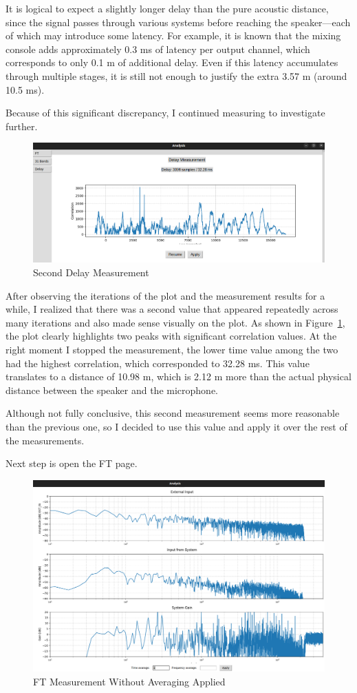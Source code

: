 It is logical to expect a slightly longer delay than the pure acoustic distance, since the signal passes through various systems before reaching the speaker—each of which may introduce some latency. For example, it is known that the mixing console adds approximately 0.3 ms of latency per output channel, which corresponds to only 0.1 m of additional delay. Even if this latency accumulates through multiple stages, it is still not enough to justify the extra 3.57 m (around 10.5 ms).

Because of this significant discrepancy, I continued measuring to investigate further.

\begin{figure}[H]
	\centering
	\includegraphics[width=0.6
	\linewidth]{Figures/Coro_delay_2.png}
	\caption{Second Delay Measurement}
	\label{fig:Coro_delay2}
\end{figure}

After observing the iterations of the plot and the measurement results for a while, I realized that there was a second value that appeared repeatedly across many iterations and also made sense visually on the plot. As shown in Figure~\ref{fig:Coro_delay2}, the plot clearly highlights two peaks with significant correlation values. At the right moment I stopped the measurement, the lower time value among the two had the highest correlation, which corresponded to 32.28 ms. This value translates to a distance of 10.98 m, which is 2.12 m more than the actual physical distance between the speaker and the microphone.

Although not fully conclusive, this second measurement seems more reasonable than the previous one, so I decided to use this value and apply it over the rest of the measurements.

Next step is open the FT page.

\begin{figure}[H]
	\centering
	\includegraphics[width=0.6
	\linewidth]{Figures/Coro_FT_NO_av.png}
	\caption{FT Measurement Without Averaging Applied}
	\label{fig:Coro_FT_no_av}
\end{figure}

